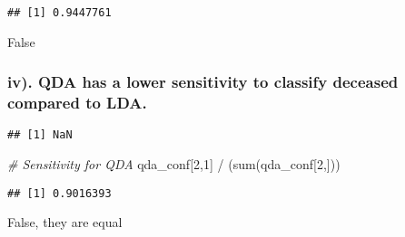\documentclass[
]{article}
\newenvironment{Shaded}{\begin{snugshade}}{\end{snugshade}}
\newcommand{\AttributeTok}[1]{\textcolor[rgb]{0.77,0.63,0.00}{#1}}
\newcommand{\CommentTok}[1]{\textcolor[rgb]{0.56,0.35,0.01}{\textit{#1}}}
\newcommand{\DecValTok}[1]{\textcolor[rgb]{0.00,0.00,0.81}{#1}}
\newcommand{\FunctionTok}[1]{\textcolor[rgb]{0.00,0.00,0.00}{#1}}
\newcommand{\NormalTok}[1]{#1}
\newcommand{\OtherTok}[1]{\textcolor[rgb]{0.56,0.35,0.01}{#1}}
\newcommand{\SpecialCharTok}[1]{\textcolor[rgb]{0.00,0.00,0.00}{#1}}
\begin{document}
\begin{verbatim}
## [1] 0.9447761
\end{verbatim}

False

\hypertarget{iv.-qda-has-a-lower-sensitivity-to-classify-deceased-compared-to-lda.}{%
\subsubsection{iv). QDA has a lower sensitivity to classify deceased
compared to
LDA.}\label{iv.-qda-has-a-lower-sensitivity-to-classify-deceased-compared-to-lda.}}

\begin{Shaded}
\end{Shaded}

\begin{verbatim}
## [1] NaN
\end{verbatim}

\begin{Shaded}
\begin{Highlighting}[]
\CommentTok{\# Sensitivity for QDA}
\NormalTok{qda\_conf[}\DecValTok{2}\NormalTok{,}\DecValTok{1}\NormalTok{] }\SpecialCharTok{/}\NormalTok{ (}\FunctionTok{sum}\NormalTok{(qda\_conf[}\DecValTok{2}\NormalTok{,]))}
\end{Highlighting}
\end{Shaded}

\begin{verbatim}
## [1] 0.9016393
\end{verbatim}

False, they are equal
\end{document}
